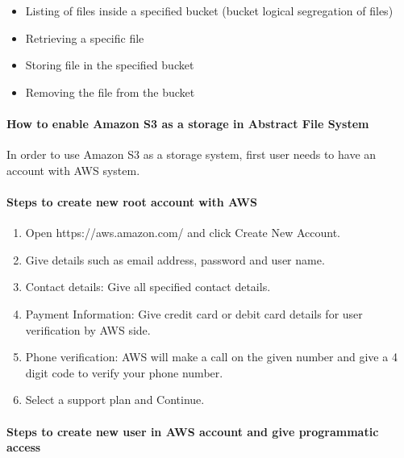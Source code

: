 \begin{itemize}
    \item   Listing of files inside a specified bucket (bucket logical
segregation of files)
    \item       Retrieving a specific file
    \item       Storing file in  the specified bucket
    \item       Removing the file from the bucket
\end{itemize}



\paragraph{How to enable Amazon S3 as a storage in Abstract File System}


In order to use Amazon S3 as a storage system, first user needs to have an
account with AWS system.


\paragraph{Steps to create new root account with AWS}


\begin{enumerate}
\item Open https://aws.amazon.com/ and click Create New Account.
\item Give details such as email address, password and user name.
\item Contact details: Give all specified contact details.
\item Payment Information: Give credit card or debit card details for
  user verification by AWS side.
\item Phone verification: AWS will make a call on the given number and
  give a 4 digit code to verify your phone number.
    \item Select a support plan and Continue.
\end{enumerate}


\paragraph{Steps to create new user in AWS account and give
  programmatic access}


